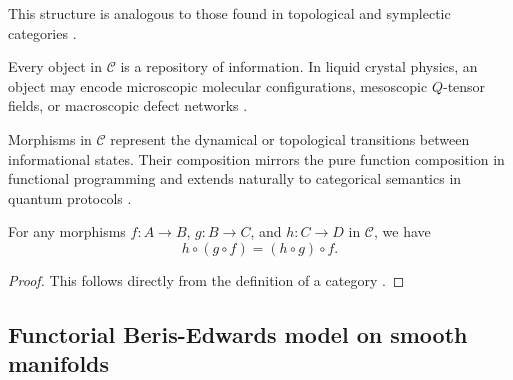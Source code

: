 	This structure is analogous to those found in topological and symplectic categories \cite{weinstein1981symplectic, guillemin1984symplectic}.
	
	\begin{axiom}
		Every object in \(\mathcal{C}\) is a repository of information. In liquid crystal physics, an object may encode microscopic molecular configurations, mesoscopic \(Q\)-tensor fields, or macroscopic defect networks \cite{degennes1993physics, spivak2014category}.
	\end{axiom}
	
	\begin{remark}
		Morphisms in \(\mathcal{C}\) represent the dynamical or topological transitions between informational states. Their composition mirrors the pure function composition in functional programming \cite{hudak1989conception} and extends naturally to categorical semantics in quantum protocols \cite{abramsky2004categorical, selinger2007dagger}.
	\end{remark}
	
	\begin{theorem}
		For any morphisms \(f: A \to B\), \(g: B \to C\), and \(h: C \to D\) in \(\mathcal{C}\), we have
		\[
		h\circ (g\circ f) = (h\circ g)\circ f.
		\]
	\end{theorem}
	
	\begin{proof}
		This follows directly from the definition of a category \cite{maclane1971categories}.
	\end{proof}
	
	\subsection{Functorial Beris-Edwards model on smooth manifolds}
	
